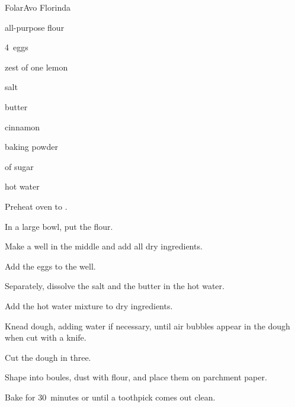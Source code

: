 \begin{recipe}{Folar}{Avo Florinda}{}

\begin{ingredients}
\item {} all-purpose flour
\item 4~eggs
\item zest of one lemon
\item {} salt
\item {} butter
\item {} cinnamon
\item {} baking powder
\item {} of sugar
\item {} hot water
\end{ingredients}

\begin{directions}
\item Preheat oven to .
\item In a large bowl, put the flour.
\item Make a well in the middle and add all dry ingredients.
\item Add the eggs to the well.
\item Separately, dissolve the salt and the butter in the hot water.
\item Add the hot water mixture to dry ingredients.
\item Knead dough, adding water if necessary, until air bubbles appear in the dough when cut with a knife.
\item Cut the dough in three.
\item Shape into boules, dust with flour, and place them on parchment paper.
\item Bake for 30~minutes or until a toothpick comes out clean.
\end{directions}

\end{recipe}
